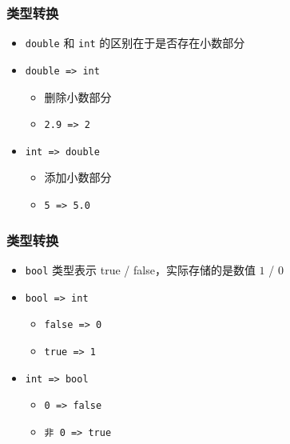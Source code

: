 \begin{frame}[fragile]
    \frametitle{类型转换}

    \begin{itemize}
        \item<1-> \lstinline|double| 和 \lstinline|int| 的区别在于是否存在小数部分

        \item<2-> \lstinline|double => int|

            \begin{itemize}
                \item 删除小数部分
                \item \lstinline|2.9 => 2|
            \end{itemize}

        \item<3-> \lstinline|int => double|

            \begin{itemize}
                \item 添加小数部分
                \item \lstinline|5 => 5.0|
            \end{itemize}

    \end{itemize}
\end{frame}

\begin{frame}[fragile]
    \frametitle{类型转换}

    \begin{itemize}
        \item<1-> \lstinline|bool| 类型表示 true / false，实际存储的是数值 $1$ / $0$

        \item<2-> \lstinline|bool => int|

            \begin{itemize}
                \item \lstinline|false => 0|
                \item \lstinline|true => 1|
            \end{itemize}

        \item<3-> \lstinline|int => bool|

            \begin{itemize}
                \item \lstinline|0 => false|
                \item \lstinline|非 0 => true|
            \end{itemize}

    \end{itemize}
\end{frame}

